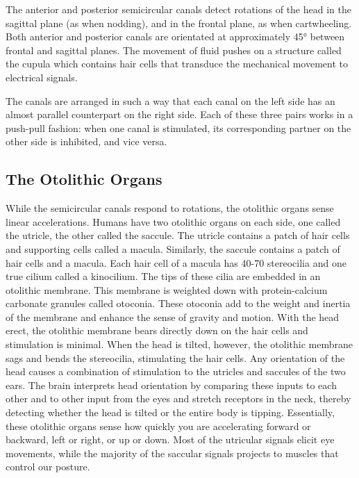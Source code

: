 \documentclass[]{book}
\begin{document}
The anterior and posterior semicircular canals detect rotations of the head in the sagittal plane (as when nodding), and in the frontal plane, as when cartwheeling. Both anterior and posterior canals are orientated at approximately 45° between frontal and sagittal planes.
The movement of fluid pushes on a structure called the cupula which contains hair cells that transduce the mechanical movement to electrical signals.

The canals are arranged in such a way that each canal on the left side has an almost parallel counterpart on the right side. Each of these three pairs works in a push-pull fashion: when one canal is stimulated, its corresponding partner on the other side is inhibited, and vice versa.

\hypertarget{the-otolithic-organs}{%
\subsection{The Otolithic Organs}\label{the-otolithic-organs}}

While the semicircular canals respond to rotations, the otolithic organs sense linear accelerations. Humans have two otolithic organs on each side, one called the utricle, the other called the saccule. The utricle contains a patch of hair cells and supporting cells called a macula. Similarly, the saccule contains a patch of hair cells and a macula. Each hair cell of a macula has 40-70 stereocilia and one true cilium called a kinocilium. The tips of these cilia are embedded in an otolithic membrane. This membrane is weighted down with protein-calcium carbonate granules called otoconia. These otoconia add to the weight and inertia of the membrane and enhance the sense of gravity and motion. With the head erect, the otolithic membrane bears directly down on the hair cells and stimulation is minimal. When the head is tilted, however, the otolithic membrane sags and bends the stereocilia, stimulating the hair cells. Any orientation of the head causes a combination of stimulation to the utricles and saccules of the two ears. The brain interprets head orientation by comparing these inputs to each other and to other input from the eyes and stretch receptors in the neck, thereby detecting whether the head is tilted or the entire body is tipping. Essentially, these otolithic organs sense how quickly you are accelerating forward or backward, left or right, or up or down. Most of the utricular signals elicit eye movements, while the majority of the saccular signals projects to muscles that control our posture.
\end{document}
